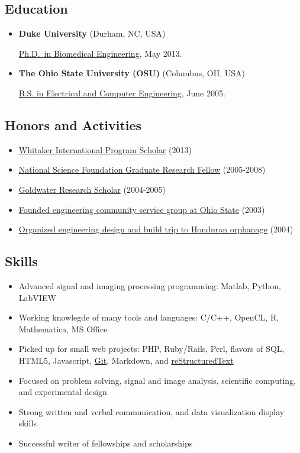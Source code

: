 \documentclass[]{article}
\begin{document}
\subsection{Education}\label{education}

\begin{itemize}
\item
  \textbf{Duke University} (Durham, NC, USA)

  \href{http://bme.duke.edu/grad}{Ph.D.~in Biomedical Engineering}, May
  2013.
\item
  \textbf{The Ohio State University (OSU)} (Columbus, OH, USA)

  \href{http://ece.osu.edu/futurestudents/undergrad}{B.S. in Electrical
  and Computer Engineering}, June 2005.
\end{itemize}

\subsection{Honors and Activities}\label{honors-and-activities}

\begin{itemize}
\itemsep1pt\parskip0pt
\item
  \href{http://www.whitaker.org/grants/fellows-scholars}{Whitaker
  International Program Scholar} (2013)
\item
  \href{http://www.nsfgrfp.org/}{National Science Foundation Graduate
  Research Fellow} (2005-2008)
\item
  \href{https://goldwater.scholarsapply.org/}{Goldwater Research
  Scholar} (2004-2005)
\item
  \href{http://ecos.osu.edu/}{Founded engineering community service
  group at Ohio State} (2003)
\item
  \href{http://www.montanadeluz.org/}{Organized engineering design and
  build trip to Honduran orphanage} (2004)
\end{itemize}

\subsection{Skills}\label{skills}

\begin{itemize}
\itemsep1pt\parskip0pt
\item
  Advanced signal and imaging processing programming: Matlab, Python,
  LabVIEW
\item
  Working knowlegde of many tools and languages: C/C++, OpenCL, R,
  Mathematica, MS Office
\item
  Picked up for small web projects: PHP, Ruby/Rails, Perl, flavors of
  SQL, HTML5, Javascript, \href{http://git-scm.com/}{Git}, Markdown, and
  \href{http://docutils.sf.net/rst.html}{reStructuredText}
\item
  Focused on problem solving, signal and image analysis, scientific
  computing, and experimental design
\item
  Strong written and verbal communication, and data visualization
  display skills
\item
  Successful writer of fellowships and scholarships
\end{itemize}
\end{document}

